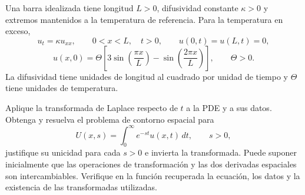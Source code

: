 Una barra idealizada tiene longitud \(L>0\), difusividad constante \(\kappa>0\) y extremos mantenidos a la temperatura de referencia. Para la temperatura en exceso,
\[
u_t=\kappa u_{xx},\qquad 0<x<L,\quad t>0,
\qquad u(0,t)=u(L,t)=0,
\]
\[
u(x,0)=\Theta\left[3\sin\left(\frac{\pi x}{L}\right)
-\sin\left(\frac{2\pi x}{L}\right)\right],\qquad \Theta>0.
\]
La difusividad tiene unidades de longitud al cuadrado por unidad de tiempo y \(\Theta\) tiene unidades de temperatura.

Aplique la transformada de Laplace respecto de \(t\) a la PDE y a sus datos. Obtenga y resuelva el problema de contorno espacial para
\[
U(x,s)=\int_0^{\infty}e^{-st}u(x,t)\,dt,\qquad s>0,
\]
justifique su unicidad para cada \(s>0\) e invierta la transformada. Puede suponer inicialmente que las operaciones de transformación y las dos derivadas espaciales son intercambiables. Verifique en la función recuperada la ecuación, los datos y la existencia de las transformadas utilizadas.
